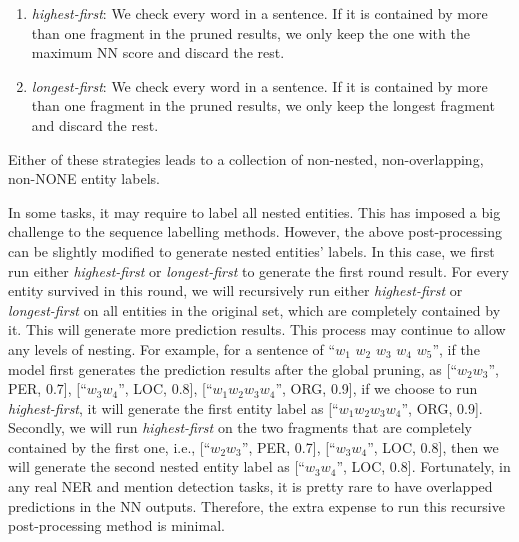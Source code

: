 \documentclass[11pt,a4paper]{article}
\begin{document}
\begin{enumerate}
	\item {\it highest-first}: We check every word in a sentence. If it is contained by more than one fragment in the pruned results, we only keep the one with the maximum NN score and discard the rest. 
	\item {\it longest-first}: We check every word in a sentence. If it is contained by more than one fragment in the pruned results, we only keep the longest fragment and discard the rest. 
\end{enumerate}

Either of these strategies leads to a collection of non-nested, non-overlapping, non-NONE entity labels.

In some tasks, it may  require to label all nested entities. This has imposed a big challenge to the sequence labelling methods. However, the above post-processing can be slightly modified to generate nested entities' labels. In this case, we first run either {\it highest-first} or {\it longest-first} to generate the first round result. For every entity survived in this round, we will recursively run either {\it highest-first} or {\it longest-first} on all entities in the original set, which are completely contained by it. This will generate more prediction results. This process may continue to allow any levels of nesting. For example, for a sentence of ``$w_1$  $w_2$ $w_3$ $w_4$ $w_5$'', 
if the model first generates the prediction results  after the global pruning, as  [``$w_2 w_3$'', PER, 0.7], [``$w_3 w_4$'', LOC, 0.8], [``$w_1 w_2 w_3 w_4$'', ORG, 0.9], if we choose to run {\it highest-first}, it will generate the first entity label as [``$w_1 w_2 w_3 w_4$'', ORG, 0.9]. Secondly, we will run {\it highest-first} on the two fragments that are completely contained by the first one, i.e.,  [``$w_2 w_3$'', PER, 0.7], [``$w_3 w_4$'', LOC, 0.8], then we will generate the second nested entity label as [``$w_3 w_4$'', LOC, 0.8].
Fortunately, in any real NER and mention detection tasks, it is pretty rare to have overlapped predictions in the NN outputs. Therefore, the extra expense to run this recursive post-processing method is minimal. 
\end{document}
